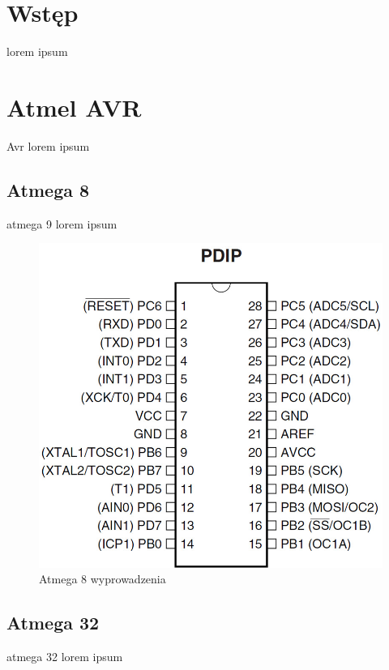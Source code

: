 \documentclass{article}
\begin{document}

  \newpage
{}  

\section{Wstęp}
lorem ipsum
\section{Atmel AVR}
Avr lorem ipsum
\subsection{Atmega 8}
atmega 9 lorem ipsum

\begin{figure}[H]
	\center
	\includegraphics[width=\textwidth]{img/atmega8-pinout.jpg}
	\caption{Atmega 8 wyprowadzenia}
	\label{fig:img1}
\end{figure}

\subsection{Atmega 32}
atmega 32 lorem ipsum
\end{document}
